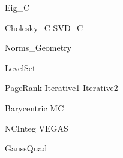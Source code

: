 \documentclass{newsiambook}
\begin{document}
{Eig_C}

{Cholesky_C}
{SVD_C}


% 


{Norms_Geometry}




{LevelSet}


{PageRank}
{Iterative1}
{Iterative2}






{Barycentric}
{MC}

{NCInteg}
{VEGAS}


{GaussQuad}





\end{document}
